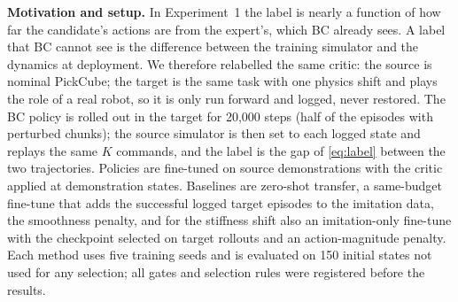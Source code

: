 \textbf{Motivation and setup.} In Experiment~1 the label is nearly a function of how far the candidate's actions are from the expert's, which BC already sees. A label that BC cannot see is the difference between the training simulator and the dynamics at deployment. We therefore relabelled the same critic: the source is nominal PickCube; the target is the same task with one physics shift and plays the role of a real robot, so it is only run forward and logged, never restored. The BC policy is rolled out in the target for 20{,}000 steps (half of the episodes with perturbed chunks); the source simulator is then set to each logged state and replays the same $K$ commands, and the label is the gap of \cref{eq:label} between the two trajectories. Policies are fine-tuned on source demonstrations with the critic applied at demonstration states. Baselines are zero-shot transfer, a same-budget fine-tune that adds the successful logged target episodes to the imitation data, the smoothness penalty, and for the stiffness shift also an imitation-only fine-tune with the checkpoint selected on target rollouts and an action-magnitude penalty. Each method uses five training seeds and is evaluated on 150 initial states not used for any selection; all gates and selection rules were registered before the results.

